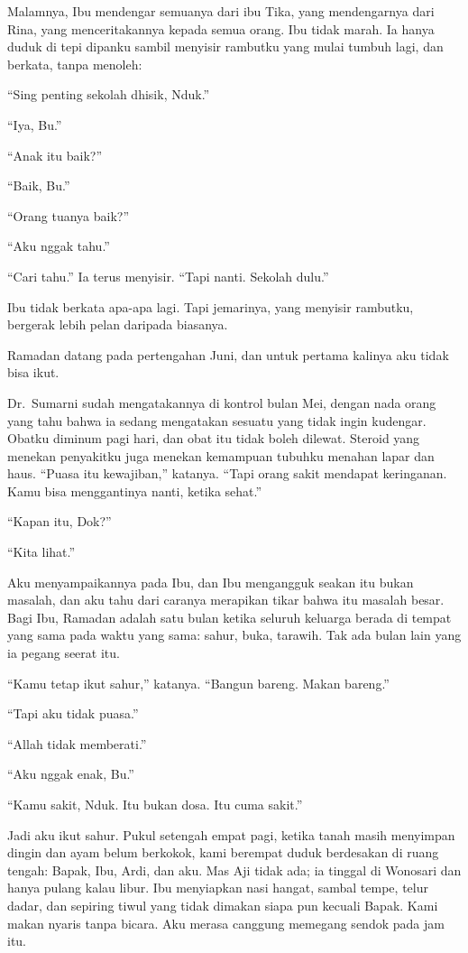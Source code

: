 \documentclass[11pt,twoside,openany]{book}
\makeatletter
\newcommand{\scenebreak}{\par\vspace{0.9em}{\centering\textsc{*\hspace{0.7em}*\hspace{0.7em}*}\par}\vspace{0.9em}\@afterindentfalse\@afterheading}
\makeatother
\begin{document}
Malamnya, Ibu mendengar semuanya dari ibu Tika, yang mendengarnya dari Rina, yang menceritakannya kepada semua orang. Ibu tidak marah. Ia hanya duduk di tepi dipanku sambil menyisir rambutku yang mulai tumbuh lagi, dan berkata, tanpa menoleh:

``Sing penting sekolah dhisik, Nduk.''

``Iya, Bu.''

``Anak itu baik?''

``Baik, Bu.''

``Orang tuanya baik?''

``Aku nggak tahu.''

``Cari tahu.'' Ia terus menyisir. ``Tapi nanti. Sekolah dulu.''

Ibu tidak berkata apa-apa lagi. Tapi jemarinya, yang menyisir rambutku, bergerak lebih pelan daripada biasanya.

\scenebreak
Ramadan datang pada pertengahan Juni, dan untuk pertama kalinya aku tidak bisa ikut.

Dr.~Sumarni sudah mengatakannya di kontrol bulan Mei, dengan nada orang yang tahu bahwa ia sedang mengatakan sesuatu yang tidak ingin kudengar. Obatku diminum pagi hari, dan obat itu tidak boleh dilewat. Steroid yang menekan penyakitku juga menekan kemampuan tubuhku menahan lapar dan haus. ``Puasa itu kewajiban,'' katanya. ``Tapi orang sakit mendapat keringanan. Kamu bisa menggantinya nanti, ketika sehat.''

``Kapan itu, Dok?''

``Kita lihat.''

Aku menyampaikannya pada Ibu, dan Ibu mengangguk seakan itu bukan masalah, dan aku tahu dari caranya merapikan tikar bahwa itu masalah besar. Bagi Ibu, Ramadan adalah satu bulan ketika seluruh keluarga berada di tempat yang sama pada waktu yang sama: sahur, buka, tarawih. Tak ada bulan lain yang ia pegang seerat itu.

``Kamu tetap ikut sahur,'' katanya. ``Bangun bareng. Makan bareng.''

``Tapi aku tidak puasa.''

``Allah tidak memberati.''

``Aku nggak enak, Bu.''

``Kamu sakit, Nduk. Itu bukan dosa. Itu cuma sakit.''

Jadi aku ikut sahur. Pukul setengah empat pagi, ketika tanah masih menyimpan dingin dan ayam belum berkokok, kami berempat duduk berdesakan di ruang tengah: Bapak, Ibu, Ardi, dan aku. Mas Aji tidak ada; ia tinggal di Wonosari dan hanya pulang kalau libur. Ibu menyiapkan nasi hangat, sambal tempe, telur dadar, dan sepiring tiwul yang tidak dimakan siapa pun kecuali Bapak. Kami makan nyaris tanpa bicara. Aku merasa canggung memegang sendok pada jam itu.
\end{document}
